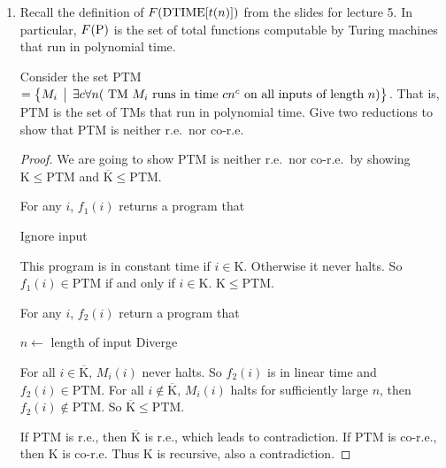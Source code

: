 \documentclass[12pt]{article}
\begin{document}
\noindent{}
\addtocounter{section}{1}

\begin{enumerate}
  \item Recall the definition of $F(\mbox{{\rm DTIME}}[t(n)])$ from the slides for lecture 5.  In particular,
  $F(\mbox{{\rm P}})$ is the set of total functions computable by Turing machines that run in polynomial time.  

Consider the set PTM  
$=\bigl\{ M_i \,\bigm|\, \exists c \forall n(\mbox{ TM $M_i$ runs in time $cn^c$ on all inputs of length $n$}
  ) \bigr\}$. 
That is, PTM is the set of TMs that run in polynomial time.
Give two reductions to show that PTM is neither r.e.\ nor co-r.e.

\begin{proof}
  We are going to show PTM is neither r.e.\ nor co-r.e.\ by showing
  $\mathrm{K}\leq \mathrm{PTM}$ and $\overline{\mathrm{K}}\leq \mathrm{PTM}$.
  
  For any $i$, $f_1(i)$ returns a program that
  \begin{center}
    \begin{algorithmic}
      \STATE Ignore input   \ELSE {}
      \ENDIF
    \end{algorithmic}
  \end{center}
  This program is in constant time if $i\in \mathrm{K}$. Otherwise it never halts. So $f_1(i)\in
  \mathrm{PTM}$ if and only if $i \in \mathrm{K}$. $\mathrm{K}\leq \mathrm{PTM}$.
  
  For any $i$, $f_2(i)$ return a program that
  \begin{center}
    \begin{algorithmic}
      \STATE $n \gets$ length of input
      \STATE Diverge
      \ELSE
      \ENDIF
    \end{algorithmic}
  \end{center}
  For all $i\in \overline{\mathrm{K}}$, $M_i(i)$ never halts. So $f_2(i)$ is in
  linear time and $f_2(i) \in \mathrm{PTM}$. For all $i\not\in
  \overline{\mathrm{K}}$, $M_i(i)$ halts for sufficiently large $n$, then
  $f_2(i)\not\in \mathrm{PTM}$. So $\overline{\mathrm{K}}\leq \mathrm{PTM}$.

  If $\mathrm{PTM}$ is r.e., then $\overline{\mathrm{K}}$ is r.e., which leads
  to contradiction. If $\mathrm{PTM}$ is co-r.e., then $\mathrm{K}$ is co-r.e.
  Thus $\mathrm{K}$ is recursive, also a contradiction.
\end{proof}


\end{enumerate}
\end{document}
